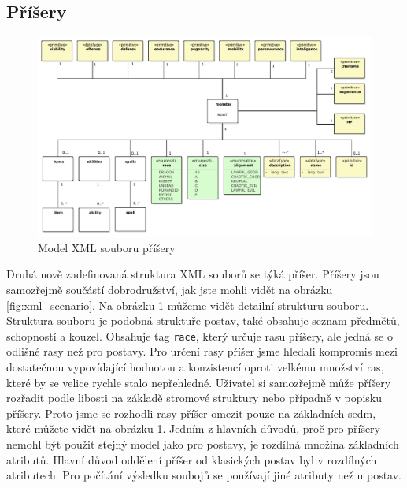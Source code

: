 \documentclass[thesis=B,czech]{resources/FITthesis}[2012/06/26]
\begin{document}
\subsection{Příšery}
\begin{figure}\centering
	\includegraphics[width=1\textwidth]{images/monsterXML}
	\caption[Model XML souboru příšery]{Model XML souboru příšery}\label{fig:xml_monster}
\end{figure}
Druhá nově zadefinovaná struktura XML souborů se týká příšer. Příšery jsou samozřejmě součástí dobrodružství, jak jste mohli vidět na obrázku \ref{fig:xml_scenario}. Na obrázku \ref{fig:xml_monster} můžeme vidět detailní strukturu souboru. Struktura souboru je podobná struktuře postav, také obsahuje seznam předmětů, schopností a kouzel. Obsahuje tag \texttt{race}, který určuje rasu příšery, ale jedná se o odlišné rasy než pro postavy. Pro určení rasy příšer jsme hledali kompromis mezi dostatečnou vypovídající hodnotou a konzistencí oproti velkému množství ras, které by se velice rychle stalo nepřehledné. Uživatel si samozřejmě může příšery rozřadit podle libosti na základě stromové struktury nebo případně v popisku příšery. Proto jsme se rozhodli rasy příšer omezit pouze na základních sedm, které můžete vidět na obrázku \ref{fig:xml_monster}. Jedním z hlavních důvodů, proč pro příšery nemohl být použit stejný model jako pro postavy, je rozdílná množina základních atributů. Hlavní důvod oddělení příšer od klasických postav byl v rozdílných atributech. Pro počítání výsledku soubojů se používají jiné atributy než u postav. 
\end{document}
